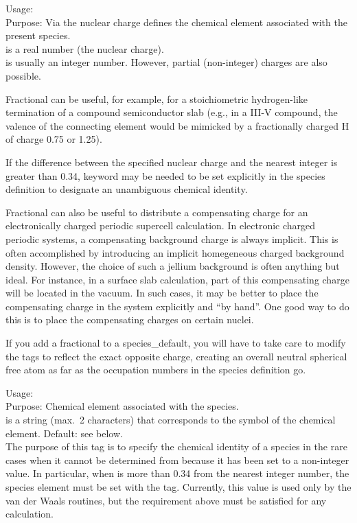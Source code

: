 {
  \noindent
  Usage:   \\[1.0ex]
  Purpose: Via the nuclear charge defines the chemical element associated with
    the present species.\\[1.0ex]
   is a real number (the nuclear charge). \\
}
 is usually an integer number. However, partial (non-integer) charges
are also possible. 

Fractional  can be useful, for example, for a stoichiometric hydrogen-like 
termination of a compound semiconductor slab (e.g., in a III-V compound, the valence of
the connecting element would be mimicked by a fractionally charged H
of charge 0.75 or 1.25). 

If the difference between the specified nuclear charge and the nearest integer is
greater than 0.34, keyword  may be needed to be set
explicitly in the species definition to designate an unambiguous chemical identity.

Fractional  can also be useful to
distribute a compensating charge for an electronically charged
periodic supercell calculation. In electronic charged periodic systems, a
compensating background charge is always implicit. This is often
accomplished by introducing an implicit homegeneous charged background
density. However, the choice of such a jellium background is often
anything but ideal. For instance, in a surface slab calculation, part
of this compensating charge will be located in the vacuum. In such
cases, it may be better to place the compensating charge in the system
explicitly and ``by hand''. One good way to do this is to place the
compensating charges on certain nuclei.\cite{Richter2013}

If you add a fractional  to a species\_default, you will
have to take care to modify the  tags to
reflect the exact opposite charge, creating an overall neutral
spherical free atom as far as the 
occupation numbers in the species definition go. 

{
  \noindent
  Usage:   \\[1.0ex]
  Purpose: Chemical element associated with the species.\\[1.0ex]
   is a string (max.\ 2 characters) that corresponds to the symbol
  of the chemical element. Default: see below.\\
}
The purpose of this tag is to specify the chemical identity of a species in the
rare cases when it cannot be determined from  because it has been set
to a non-integer value. In particular, when  is more than 0.34 from
the nearest integer number, the species element must be set with the
 tag. Currently, this value is used only by the
van der Waals routines, but the requirement above must be satisfied for any
calculation.
